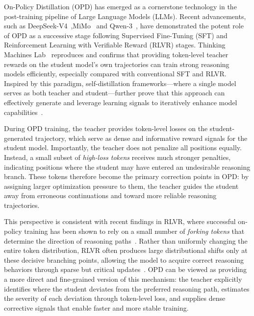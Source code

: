 On-Policy Distillation (OPD) has emerged as a cornerstone technology in the post-training pipeline of Large Language Models (LLMs). Recent advancements, such as DeepSeek-V4~\cite{deepseekv4},MiMo~\cite{xiao2026mimo} and Qwen-3~\cite{yang2025qwen3}, have demonstrated the potent role of OPD as a successive stage following Supervised Fine-Tuning (SFT) and Reinforcement Learning with Verifiable Reward (RLVR) stages. Thinking Machines Lab~\cite{lu2025onpolicydistillation} reproduces and confirms that providing token-level teacher rewards on the student model’s own trajectories can train strong reasoning models efficiently, especially compared with conventional SFT and RLVR. Inspired by this paradigm, self-distillation frameworks—where a single model serves as both teacher and student—further prove that this approach can effectively generate and leverage learning signals to iteratively enhance model capabilities~\cite{zhao2026self,shenfeld2026self,hubotter2026reinforcement}.

During OPD training, the teacher provides token-level losses on the student-generated trajectory, which serve as dense and informative reward signals for the student model. Importantly, the teacher does not penalize all positions equally. Instead, a small subset of \textit{high-loss tokens} receives much stronger penalties, indicating positions where the student may have entered an undesirable reasoning branch. These tokens therefore become the primary correction points in OPD: by assigning larger optimization pressure to them, the teacher guides the student away from erroneous continuations and toward more reliable reasoning trajectories.

This perspective is consistent with recent findings in RLVR, where successful on-policy training has been shown to rely on a small number of \textit{forking tokens} that determine the direction of reasoning paths~\cite{wangbeyond}. Rather than uniformly changing the entire token distribution, RLVR often produces large distributional shifts only at these decisive branching points, allowing the model to acquire correct reasoning behaviors through sparse but critical updates~\cite{meng2026sparse}. OPD can be viewed as providing a more direct and fine-grained version of this mechanism: the teacher explicitly identifies where the student deviates from the preferred reasoning path, estimates the severity of each deviation through token-level loss, and supplies dense corrective signals that enable faster and more stable training.

